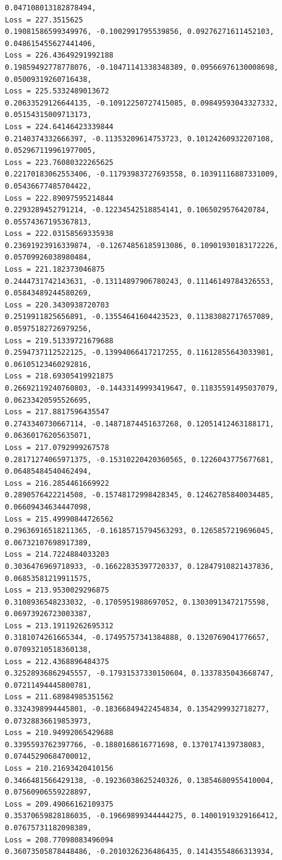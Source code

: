 \documentclass[11pt]{article}
\begin{document}
\begin{Verbatim}[commandchars=\\\{\}]
0.047108013182878494,
Loss = 227.3515625
0.19081586599349976, -0.1002991795539856, 0.09276271611452103,
0.048615455627441406,
Loss = 226.43649291992188
0.19859492778778076, -0.10471141338348389, 0.09566976130008698,
0.05009319260716438,
Loss = 225.5332489013672
0.20633529126644135, -0.10912250727415085, 0.09849593043327332,
0.05154315009713173,
Loss = 224.64146423339844
0.2140374332666397, -0.11353209614753723, 0.10124260932207108,
0.052967119961977005,
Loss = 223.76080322265625
0.22170183062553406, -0.11793983727693558, 0.10391116887331009,
0.05436677485704422,
Loss = 222.89097595214844
0.2293289452791214, -0.12234542518854141, 0.1065029576420784,
0.05574367195367813,
Loss = 222.03158569335938
0.23691923916339874, -0.12674856185913086, 0.10901930183172226,
0.05709926038980484,
Loss = 221.182373046875
0.2444731742143631, -0.13114897906780243, 0.11146149784326553,
0.05843489244580269,
Loss = 220.3430938720703
0.2519911825656891, -0.13554641604423523, 0.11383082717657089,
0.05975182726979256,
Loss = 219.51339721679688
0.2594737112522125, -0.13994066417217255, 0.11612855643033981,
0.06105123460292816,
Loss = 218.69305419921875
0.26692119240760803, -0.14433149993419647, 0.11835591495037079,
0.06233420595526695,
Loss = 217.8817596435547
0.2743340730667114, -0.14871874451637268, 0.12051412463188171,
0.06360176205635071,
Loss = 217.0792999267578
0.28171274065971375, -0.15310220420360565, 0.1226043775677681,
0.06485484540462494,
Loss = 216.2854461669922
0.2890576422214508, -0.15748172998428345, 0.12462785840034485,
0.06609434634447098,
Loss = 215.49990844726562
0.29636916518211365, -0.16185715794563293, 0.1265857219696045,
0.06732107698917389,
Loss = 214.7224884033203
0.3036476969718933, -0.16622835397720337, 0.12847910821437836,
0.06853581219911575,
Loss = 213.9530029296875
0.3108936548233032, -0.1705951988697052, 0.13030913472175598,
0.06973926723003387,
Loss = 213.19119262695312
0.3181074261665344, -0.17495757341384888, 0.1320769041776657,
0.07093210518360138,
Loss = 212.4368896484375
0.32528936862945557, -0.17931537330150604, 0.1337835043668747,
0.07211494445800781,
Loss = 211.68984985351562
0.3324398994445801, -0.18366849422454834, 0.1354299932718277,
0.07328836619853973,
Loss = 210.94992065429688
0.3395593762397766, -0.1880168616771698, 0.1370174139738083,
0.07445290684700012,
Loss = 210.21693420410156
0.3466481566429138, -0.19236038625240326, 0.13854680955410004,
0.07560906559228897,
Loss = 209.49066162109375
0.35370659828186035, -0.19669899344444275, 0.14001919329166412,
0.07675731182098389,
Loss = 208.77098083496094
0.36073505878448486, -0.2010326236486435, 0.14143554866313934,

\end{Verbatim}
\end{document}
